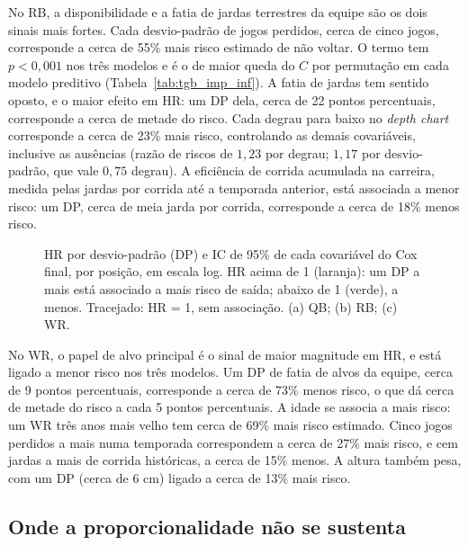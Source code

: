 No RB, a disponibilidade e a fatia de jardas terrestres da equipe são os dois sinais mais fortes. Cada desvio-padrão de jogos perdidos, cerca de cinco jogos, corresponde a cerca de 55\% mais risco estimado de não voltar. O termo tem $p<0{,}001$ nos três modelos e é o de maior queda do $C$ por permutação em cada modelo preditivo (Tabela~\ref{tab:tgb_imp_inf}). A fatia de jardas tem sentido oposto, e o maior efeito em HR: um DP dela, cerca de 22 pontos percentuais, corresponde a cerca de metade do risco. Cada degrau para baixo no \textit{depth chart} corresponde a cerca de 23\% mais risco, controlando as demais covariáveis, inclusive as ausências (razão de riscos de $1{,}23$ por degrau; $1{,}17$ por desvio-padrão, que vale $0{,}75$ degrau). A eficiência de corrida acumulada na carreira, medida pelas jardas por corrida até a temporada anterior, está associada a menor risco: um DP, cerca de meia jarda por corrida, corresponde a cerca de 18\% menos risco.

\begin{figure}[H]
\centering
{}
\caption{HR por desvio-padrão (DP) e IC de 95\% de cada covariável do Cox final, por posição, em escala log. HR acima de 1 (laranja): um DP a mais está associado a mais risco de saída; abaixo de 1 (verde), a menos. Tracejado: HR = 1, sem associação. (a) QB; (b) RB; (c) WR.}
\label{fig:forest_cox}
\end{figure}

No WR, o papel de alvo principal é o sinal de maior magnitude em HR, e está ligado a menor risco nos três modelos. Um DP de fatia de alvos da equipe, cerca de 9 pontos percentuais, corresponde a cerca de 73\% menos risco, o que dá cerca de metade do risco a cada 5 pontos percentuais. A idade se associa a mais risco: um WR três anos mais velho tem cerca de 69\% mais risco estimado. Cinco jogos perdidos a mais numa temporada correspondem a cerca de 27\% mais risco, e cem jardas a mais de corrida históricas, a cerca de 15\% menos. A altura também pesa, com um DP (cerca de 6 cm) ligado a cerca de 13\% mais risco.


\subsection{Onde a proporcionalidade não se sustenta}
\label{subsec:schoenfeld}


